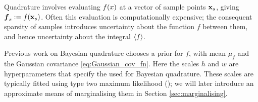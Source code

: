 \documentclass[twoside]{article}
\begin{document}
Quadrature involves evaluating $f(x)$ at a vector of sample points ${\bf x}_s$, giving $\vf\pha_s\deq f(\vlfv_s)$. Often this evaluation is computationally expensive; the consequent sparsity of samples introduces uncertainty about the function $f$ between them, and hence uncertainty about the integral $\langle f \rangle$.



Previous work on Bayesian quadrature chooses a \gpb prior for $f$, with mean $\mu_f$ and the Gaussian covariance \eqref{eq:Gaussian_cov_fn}. Here the scales $h$ and $w$ are hyperparameters that specify the  \gpb used for Bayesian quadrature. These scales are typically fitted using type two maximum likelihood (); we will later introduce an approximate means of marginalising them in Section \ref{sec:marginalising}.

\end{document}
